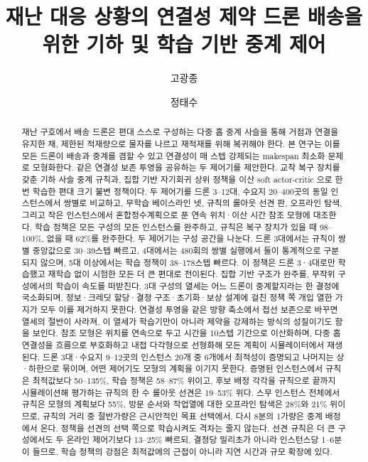 \documentclass[final,5p,times,twocolumn]{elsarticle}
\begin{document}
\begin{frontmatter}

\title{재난 대응 상황의 연결성 제약 드론 배송을 위한 기하 및 학습 기반 중계 제어}

\author[ku]{고광종}
\author[ku]{정태수}

\begin{abstract}
재난 구호에서 배송 드론은 편대 스스로 구성하는 다중 홉 중계 사슬을 통해 거점과 연결을 유지한
채, 제한된 적재량으로 물자를 나르고 재적재를 위해 복귀해야 한다. 본 연구는 이를 모든 드론이 배송과
중계를 겸할 수 있고 연결성이 매 스텝 강제되는 makespan 최소화 문제로 모형화한다. 같은
연결성 보존 투영을 공유하는 두 제어기를 제안한다. 교착 복구 장치를 갖춘 기하 사슬 중계 규칙과,
집합 기반 자기회귀 상위 정책을 이산 soft actor-critic 으로 한 번 학습한 편대 크기 불변 정책이다.
두 제어기를 드론 3--12대, 수요지 20--400곳의 동일 인스턴스에서 쌍별로 비교하고, 무학습 베이스라인
넷, 규칙의 롤아웃 선견 판, 오프라인 탐색, 그리고 작은 인스턴스에서 혼합정수계획으로 푼 연속 위치·이산
시간 참조 모형에 대조한다. 학습 정책은 모든 구성의 모든
인스턴스를 완주하고, 규칙은 복구 장치가 있을 때 98--100\%, 없을 때 62\%를 완주한다. 두 제어기는
구성 공간을 나눈다. 드론 3대에서는 규칙이 쌍별 중앙값으로 30--39스텝 빠르고, 4대에서는 480회의
쌍별 실행에서 둘이 통계적으로 구분되지 않으며, 5대 이상에서는 학습 정책이 38--178스텝 빠르다. 이
정책은 드론 3·4대로만 학습했고 재학습 없이 시험한 모든 더 큰 편대로 전이된다. 집합 기반 구조가
완주를, 무작위 구성에서의 학습이 속도를 떠받친다. 3대 구성의 열세는 어느 드론이 중계할지라는 한
결정에 국소화되며, 정보·크레딧 할당·결정 구조·초기화·보상 설계에 걸친 정책 쪽 개입 열한 가지가
모두 이를 제거하지 못한다. 연결성 투영을 같은 방향 축소에서 접선 보존으로 바꾸면 열세의 절반이
사라져, 이 열세가 학습기만이 아니라 제약을 강제하는 방식의 성질이기도 함을 보인다. 참조 모형은
위치를 연속으로 두고 시간을 10스텝 기간으로 이산화하며, 다중 홉 연결성을 흐름으로 부호화하고 내접
다각형으로 선형화해 모든 계획이 시뮬레이터에서 재생된다. 드론 3대·수요지 9--12곳의 인스턴스 20개
중 6개에서 최적성이 증명되고 나머지는 상·하한으로 묶이며, 어떤 제어기도 모형의 계획을 이기지 못한다.
증명된 인스턴스에서 규칙은 최적값보다 50--135\%, 학습 정책은 58--87\% 위이고, 후보 배정 각각을 규칙으로
끝까지 시뮬레이션해 평가하는 규칙의 한 수 롤아웃 선견은 19--53\% 위다. 스무 인스턴스 전체에서 규칙은
모형의 계획보다 55\%, 방문 순서와 작업열에 대한 오프라인 탐색은 28\%와 21\% 위이므로, 규칙의 거리 중
절반가량은 근시안적인 목표 선택에서, 다시 8분의 1가량은 중계 배정에서 온다. 정책을 선견의 선택 쪽으로 학습시켜도 격차는 줄지 않는다. 선견
규칙은 더 큰 구성에서도 두 온라인 제어기보다 13--25\% 빠르되, 결정당 밀리초가 아니라 인스턴스당
1--6분이 들므로, 학습 정책의 강점은 최적값에의 근접이 아니라 지연 시간과 규모 확장에 있다.
\end{abstract}


\end{frontmatter}
\end{document}

